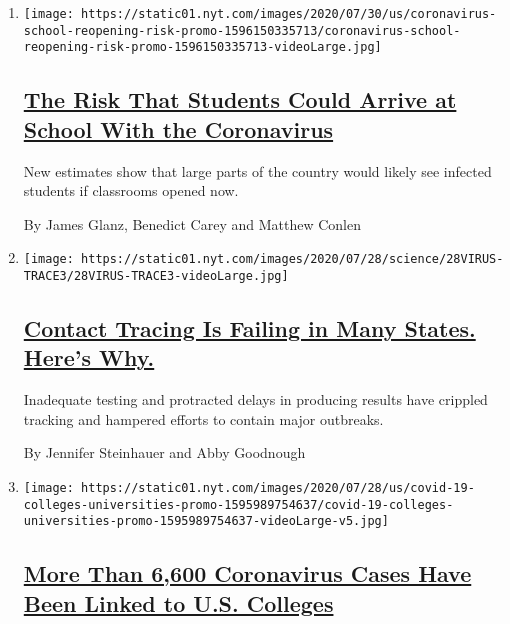 \begin{enumerate}
\def\labelenumi{\arabic{enumi}.}
\item
  \texttt{[image: https://static01.nyt.com/images/2020/07/30/us/coronavirus-school-reopening-risk-promo-1596150335713/coronavirus-school-reopening-risk-promo-1596150335713-videoLarge.jpg]}

  \hypertarget{the-risk-that-students-could-arrive-at-school-with-the-coronavirus}{%
  \subsection{\texorpdfstring{\href{/interactive/2020/07/31/us/coronavirus-school-reopening-risk.html}{The
  Risk That Students Could Arrive at School With the
  Coronavirus}}{The Risk That Students Could Arrive at School With the Coronavirus}}\label{the-risk-that-students-could-arrive-at-school-with-the-coronavirus}}

  New estimates show that large parts of the country would likely see
  infected students if classrooms opened now.

  By James Glanz, Benedict Carey and Matthew Conlen
\item
  \texttt{[image: https://static01.nyt.com/images/2020/07/28/science/28VIRUS-TRACE3/28VIRUS-TRACE3-videoLarge.jpg]}

  \hypertarget{contact-tracing-is-failing-in-many-states-heres-why-1}{%
  \subsection{\texorpdfstring{\href{/2020/07/31/health/covid-contact-tracing-tests.html}{Contact
  Tracing Is Failing in Many States. Here's
  Why.}}{Contact Tracing Is Failing in Many States. Here's Why.}}\label{contact-tracing-is-failing-in-many-states-heres-why-1}}

  Inadequate testing and protracted delays in producing results have
  crippled tracking and hampered efforts to contain major outbreaks.

  By Jennifer Steinhauer and Abby Goodnough
\item
  \texttt{[image: https://static01.nyt.com/images/2020/07/28/us/covid-19-colleges-universities-promo-1595989754637/covid-19-colleges-universities-promo-1595989754637-videoLarge-v5.jpg]}

  \hypertarget{more-than-6600-coronavirus-cases-have-been-linked-to-us-colleges}{%
  \subsection{\texorpdfstring{\href{/interactive/2020/07/28/us/covid-19-colleges-universities.html}{More
  Than 6,600 Coronavirus Cases Have Been Linked to U.S.
  Colleges}}{More Than 6,600 Coronavirus Cases Have Been Linked to U.S. Colleges}}\label{more-than-6600-coronavirus-cases-have-been-linked-to-us-colleges}}


\end{enumerate}
